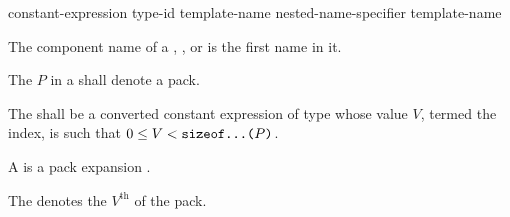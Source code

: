 \documentclass{wg21}
\begin{document}
\begin{bnf}
    \br
    constant-expression\br
    type-id\br
     template-name\br
    nested-name-specifier  template-name
\end{bnf}

\pnum
{}%
The component name of a
,
, or
is the first name in it.

\begin{addedblock}

\pnum
The  $P$ in a 
shall denote a pack.

\pnum
The  shall be
a converted constant expression  of type 
whose value $V$, termed the index,
is such that $0 \le V < \texttt{sizeof...($P$)}$.

\pnum
A  is a pack expansion .

\pnum
\begin{note}
    The  denotes
    the $V^\text{th}$  of the pack.
\end{note}

\end{addedblock}
\end{document}
